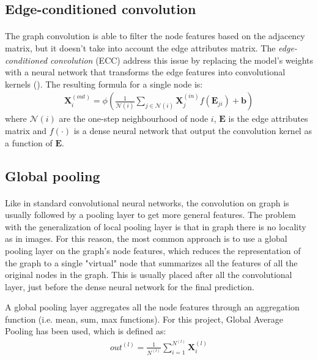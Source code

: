 \subsection{Edge-conditioned convolution}
\paragraph{} The graph convolution is able to filter the node features based on the adjacency matrix, but it doesn't take into account the edge attributes matrix. The \textit{edge-conditioned convolution} (ECC) address this issue by replacing the model's weights with a neural network that transforms the edge features into convolutional kernels (\cite{arXiv:eccn}). The resulting formula for a single node is:
\begin{align}
    \mathbf{X}^{(out)}_i=\phi\left(\frac{1}{\mathcal{N}(i)} \sum_{j \in \mathcal{N}(i)} \mathbf{X}^{(in)}_j f(\mathbf{E}_{ji}) + \mathbf{b}\right)
\end{align}
where $\mathcal{N}(i)$ are the one-step neighbourhood of node $i$, $\mathbf{E}$ is the edge attributes matrix and $f(\cdot)$ is a dense neural network that output the convolution kernel as a function of $\mathbf{E}$.

\subsection{Global pooling}
\paragraph{} Like in standard convolutional neural networks, the convolution on graph is usually followed by a pooling layer to get more general features. The problem with the generalization of local pooling layer is that in graph there is no locality as in images. For this reason, the most common approach is to use a global pooling layer on the graph's node features, which reduces the representation of the graph to a single "virtual" node that summarizes all the features of all the original nodes in the graph. This is usually placed after all the convolutional layer, just before the dense neural network for the final prediction.

A global pooling layer aggregates all the node features through an aggregation function (i.e. mean, sum, max functions). For this project, Global Average Pooling has been used, which is defined as:
\begin{align}
    out^{(l)} = \frac{1}{N^{(l)}} \sum_{i=1}^{N^{(l)}} \mathbf{X}^{(l)}_i
\end{align}

